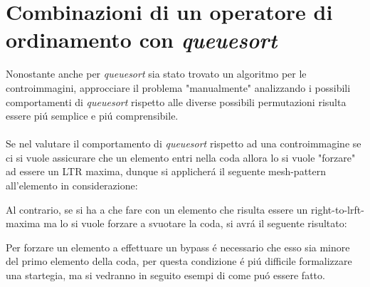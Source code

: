 \section*{Combinazioni di un operatore di ordinamento con \textit{queuesort}}
Nonostante anche per \textit{queuesort} sia stato trovato un algoritmo per le controimmagini\cite{magnusson2013sorting}, approcciare il problema "manualmente" analizzando i possibili comportamenti di \textit{queuesort} rispetto alle diverse possibili permutazioni risulta essere pi\'u semplice e pi\'u comprensibile.\\\\
Se nel valutare il comportamento di \textit{queuesort} rispetto ad una controimmagine se ci si vuole assicurare che un elemento entri nella coda allora lo si vuole "forzare" ad essere un LTR maxima, dunque si applicher\'a il seguente mesh-pattern all'elemento in considerazione:
\begin{center}
\end{center}
Al contrario, se si ha a che fare con un elemento che risulta essere un right-to-lrft-maxima ma lo si vuole forzare a svuotare la coda, si avr\'a il seguente risultato:
\begin{center}
\end{center}
Per forzare un elemento a effettuare un bypass \'e necessario che esso sia minore del primo elemento della coda, per questa condizione \'e pi\'u difficile formalizzare una startegia, ma si vedranno in seguito esempi di come pu\'o essere fatto. 
